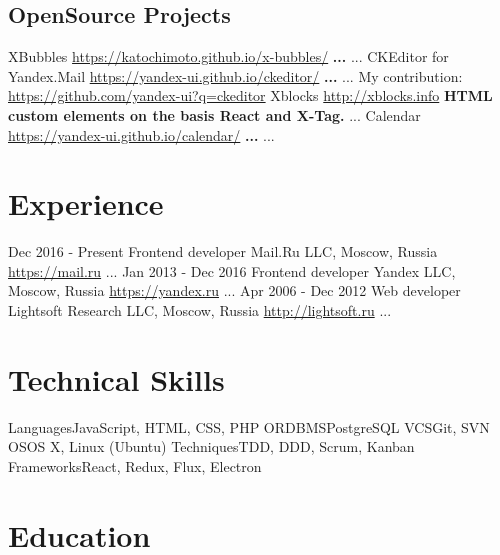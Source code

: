\documentclass[11pt,a4paper]{moderncv}
\begin{document}
  \subsection{OpenSource Projects}
  \cvline
    {XBubbles}
    {\url{https://katochimoto.github.io/x-bubbles/}\newline{}
    \textbf{...}\newline{}
    ...}
  \cvline
    {CKEditor for Yandex.Mail}
    {\url{https://yandex-ui.github.io/ckeditor/}\newline{}
    \textbf{...}\newline{}
    ...\newline{}
    My contribution:\newline{}
    \url{https://github.com/yandex-ui?q=ckeditor}
    }
  \cvline
    {Xblocks}
    {\url{http://xblocks.info}\newline{}
    \textbf{HTML custom elements on the basis React and X-Tag.}\newline{}
    ...}
  \cvline
    {Calendar}
    {\url{https://yandex-ui.github.io/calendar/}\newline{}
    \textbf{...}\newline{}
    ...}
\pagebreak
\section{Experience}
\cventry
  {Dec 2016 - Present}
  {Frontend developer}
  {Mail.Ru LLC, Moscow, Russia}
  {\newline{}\url{https://mail.ru}}{}
  {...}
\cventry
  {Jan 2013 - Dec 2016}
  {Frontend developer}
  {Yandex LLC, Moscow, Russia}
  {\newline{}\url{https://yandex.ru}}{}
  {...}
\cventry
  {Apr 2006 - Dec 2012}
  {Web developer}
  {Lightsoft Research LLC, Moscow, Russia}
  {\newline{}\url{http://lightsoft.ru}}{}
  {...}

\section{Technical Skills}
\cvline
  {Languages}{JavaScript, HTML, CSS, PHP}
\cvline
  {ORDBMS}{PostgreSQL}
\cvline
  {VCS}{Git, SVN}
\cvline
  {OS}{OS X, Linux (Ubuntu)}
\cvline
  {Techniques}{TDD, DDD, Scrum, Kanban}
\cvline
  {Frameworks}{React, Redux, Flux, Electron}

\section{Education}
\end{document}
